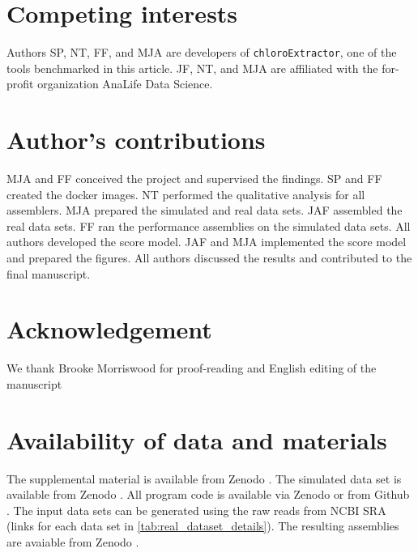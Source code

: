 \documentclass{bmcart}
\newcommand{\formatprogramnames}[1]{\texttt{#1}}
\newcommand{\ce}{\formatprogramnames{chloroExtractor}}
\begin{document}
\begin{backmatter}

\section*{Competing interests}
Authors  SP, NT, FF, and MJA are developers of \ce{}, one of the tools benchmarked in this article.
JF, NT, and MJA are affiliated with the for-profit organization AnaLife Data Science.

\section*{Author's contributions}
MJA and FF conceived the project and supervised the findings.
SP and FF created the docker images.
NT performed the qualitative analysis for all assemblers.
MJA prepared the simulated and real data sets.
JAF assembled the real data sets.
FF ran the performance assemblies on the simulated data sets.
All authors developed the score model.
JAF and MJA implemented the score model and prepared the figures.
All authors discussed the results and contributed to the final manuscript.

\section*{Acknowledgement}
We thank Brooke Morriswood for proof-reading and English editing of the manuscript

\section*{Availability of data and materials}
The supplemental material is available from Zenodo \cite{zenodosupplement}. The simulated data set is available from Zenodo \cite{zenododataset}. All program code is available via Zenodo \cite{zenodorepo} or from Github \cite{github-benchmark-repo}. The input data sets can be generated using the raw reads from NCBI SRA (links for each data set in \cref{tab:real_dataset_details}). The resulting assemblies are avaiable from Zenodo \cite{zenodoassemblies}.



\end{backmatter}
\end{document}
